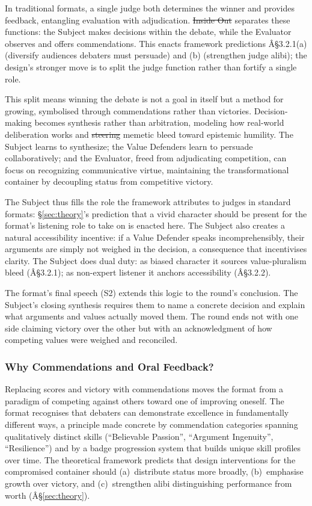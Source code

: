 \documentclass[12pt]{article}
\makeatletter
\providecommand{\DIFaddtex}[1]{{\protect\color[rgb]{0,0.5,0}\uwave{#1}}} %
\providecommand{\DIFdeltex}[1]{{\protect\color{red}\sout{#1}}} %
\providecommand{\DIFaddbegin}{} %
\providecommand{\DIFaddend}{} %
\providecommand{\DIFdelbegin}{} %
\providecommand{\DIFdelend}{} %
\providecommand{\DIFadd}[1]{\texorpdfstring{\DIFaddtex{#1}}{#1}} %
\providecommand{\DIFdel}[1]{\texorpdfstring{\DIFdeltex{#1}}{}} %
\providecommand{\DIFscaledelfig}{0.5}
\newlength{\DIFdelgraphicswidth} %
\newlength{\DIFdelgraphicsheight} %
\providecommand{\DIFaddincludegraphics}[2][]{{\color[rgb]{0,0.5,0}\fbox{\DIFOincludegraphics[#1]{#2}}}} %
\providecommand{\DIFdelincludegraphics}[2][]{%
\sbox{\DIFdelgraphicsbox}{\DIFOincludegraphics[#1]{#2}}%
\settoboxwidth{\DIFdelgraphicswidth}{\DIFdelgraphicsbox} %
\settoboxtotalheight{\DIFdelgraphicsheight}{\DIFdelgraphicsbox} %
\scalebox{\DIFscaledelfig}{%
\parbox[b]{\DIFdelgraphicswidth}{\usebox{\DIFdelgraphicsbox}\\[-\baselineskip] \rule{\DIFdelgraphicswidth}{0em}}\llap{\resizebox{\DIFdelgraphicswidth}{\DIFdelgraphicsheight}{%
\setlength{\unitlength}{\DIFdelgraphicswidth}%
\begin{picture}(1,1)%
\thicklines\linethickness{2pt} %
{\color[rgb]{1,0,0}\put(0,0){\framebox(1,1){}}}%
{\color[rgb]{1,0,0}\put(0,0){\line( 1,1){1}}}%
{\color[rgb]{1,0,0}\put(0,1){\line(1,-1){1}}}%
\end{picture}%
}\hspace*{3pt}}} %
} %
\DeclareRobustCommand{\DIFaddbegin}{\DIFOaddbegin \let\includegraphics\DIFaddincludegraphics} %
\DeclareRobustCommand{\DIFaddend}{\DIFOaddend \let\includegraphics\DIFOincludegraphics} %
\DeclareRobustCommand{\DIFdelbegin}{\DIFOdelbegin \let\includegraphics\DIFdelincludegraphics} %
\DeclareRobustCommand{\DIFdelend}{\DIFOaddend \let\includegraphics\DIFOincludegraphics} %
\let\sout@orig\sout %
\renewcommand{\sout}[1]{\ifmmode\text{\sout@orig{\ensuremath{#1}}}\else\sout@orig{#1}\fi} %
\makeatother
\begin{document}
In traditional formats, a single judge both determines the winner and provides feedback, entangling evaluation with adjudication. \DIFdelbegin \DIFdel{Inside Out }\DIFdelend \DIFaddbegin \emph{\DIFadd{Inside Out}} \DIFaddend separates these functions: the Subject makes decisions within the debate, while the Evaluator observes and offers commendations. This enacts framework predictions Â§3.2.1(a) (diversify audiences debaters must persuade) and (b) (strengthen judge alibi); the design's stronger move is to split the judge function rather than fortify a single role.

This split means winning the debate is not a goal in itself but a method for growing, symbolised through commendations rather than victories. Decision-making becomes synthesis rather than arbitration, modeling how real-world deliberation works and \DIFdelbegin \DIFdel{steering }\DIFdelend \DIFaddbegin \DIFadd{intended to steer }\DIFaddend memetic bleed toward epistemic humility. The Subject learns to synthesize; the Value Defenders learn to persuade collaboratively; and the Evaluator, freed from adjudicating competition, can focus on recognizing communicative virtue, maintaining the transformational container by decoupling status from competitive victory.

The Subject thus fills the role the framework attributes to judges in standard formats: \S\ref{sec:theory}'s prediction that a vivid character should be present for the format's listening role to take on is enacted here. The Subject also creates a natural accessibility incentive: if a Value Defender speaks incomprehensibly, their arguments are simply not weighed in the decision, a consequence that incentivises clarity. The Subject does dual duty: as biased character it sources value-pluralism bleed (Â§3.2.1); as non-expert listener it anchors accessibility (Â§3.2.2).

The format's final speech (S2) extends this logic to the round's conclusion. The Subject's closing synthesis requires them to name a concrete decision and explain what arguments and values actually moved them. The round ends not with one side claiming victory over the other but with an acknowledgment of how competing values were weighed and reconciled.

\subsubsection{Why Commendations and Oral Feedback?}

Replacing scores and victory with commendations moves the format from a paradigm of competing against others toward one of improving oneself. The format recognises that debaters can demonstrate excellence in fundamentally different ways, a principle made concrete by commendation categories spanning qualitatively distinct skills (``Believable Passion'', ``Argument Ingenuity'', ``Resilience'') and by a badge progression system that builds unique skill profiles over time. The theoretical framework predicts that design interventions for the compromised container should (a)~distribute status more broadly, (b)~emphasise growth over victory, and (c)~strengthen alibi distinguishing performance from worth (Â§\ref{sec:theory}).
\end{document}
